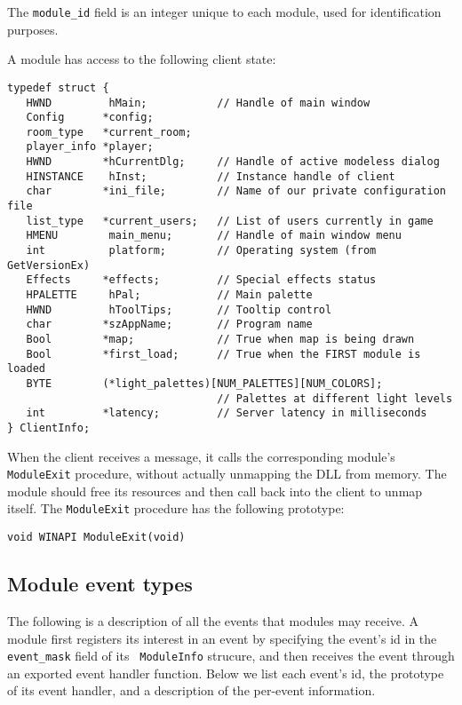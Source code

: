 The {\tt module\_id} field is an integer unique to each module, used
for identification purposes.

A module has access to the following client state:
\begin{verbatim}
typedef struct {
   HWND         hMain;           // Handle of main window
   Config      *config;
   room_type   *current_room;
   player_info *player;
   HWND        *hCurrentDlg;     // Handle of active modeless dialog
   HINSTANCE    hInst;           // Instance handle of client
   char        *ini_file;        // Name of our private configuration file
   list_type   *current_users;   // List of users currently in game
   HMENU        main_menu;       // Handle of main window menu
   int          platform;        // Operating system (from GetVersionEx)
   Effects     *effects;         // Special effects status
   HPALETTE     hPal;            // Main palette
   HWND         hToolTips;       // Tooltip control
   char        *szAppName;       // Program name
   Bool        *map;             // True when map is being drawn
   Bool        *first_load;      // True when the FIRST module is loaded
   BYTE        (*light_palettes)[NUM_PALETTES][NUM_COLORS]; 
                                 // Palettes at different light levels
   int         *latency;         // Server latency in milliseconds
} ClientInfo;
\end{verbatim}

When the client receives a  message, it calls
the corresponding module's {\tt ModuleExit} procedure, without
actually unmapping the DLL from memory.  The module should free its
resources and then call back into the client to unmap itself.  The
{\tt ModuleExit} procedure has the following prototype:
\begin{verbatim}
void WINAPI ModuleExit(void)
\end{verbatim}

\subsection{Module event types}

The following is a description of all the events that modules may
receive.  A module first registers its interest in an event by
specifying the event's id in the {\tt event\_mask} field of its {\tt
ModuleInfo} strucure, and then receives the event through an exported
event handler function.  Below we list each event's id, the prototype
of its event handler, and a description of the per-event information.

